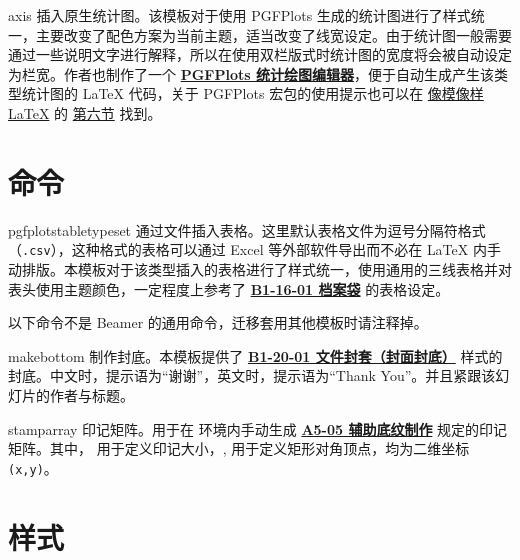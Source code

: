\documentclass[a4paper,12pt]{article}
\begin{document}
\begin{CJK}{UTF8}{song}
\begin{docEnvironment*}[doclang/environment content=code]{axis}{}
    插入原生统计图。该模板对于使用 \textsf{PGFPlots} 生成的统计图进行了样式统一，主要改变了配色方案为当前主题，适当改变了线宽设定。由于统计图一般需要通过一些说明文字进行解释，所以在使用双栏版式时统计图的宽度将会被自动设定为栏宽。作者也制作了一个 \href{https://logcreative.github.io/PGFPlotsEdt/}{\textbf{PGFPlots 统计绘图编辑器}}，便于自动生成产生该类型统计图的 \LaTeX{} 代码，关于 \textsf{PGFPlots} 宏包的使用提示也可以在 \href{https://logcreative.github.io/LaTeXSparkle/}{像模像样\LaTeX} 的 \href{https://logcreative.github.io/LaTeXSparkle/src/art/chapter06.html}{第六节} 找到。
\end{docEnvironment*}

\section{命令}

\begin{docCommand*}[]{pgfplotstabletypeset}{}
    通过文件插入表格。这里默认表格文件为逗号分隔符格式（\verb".csv"），这种格式的表格可以通过 Excel 等外部软件导出而不必在 \LaTeX{} 内手动排版。本模板对于该类型插入的表格进行了样式统一，使用通用的三线表格并对表头使用主题颜色，一定程度上参考了 \href{https://vi.sjtu.edu.cn/index.php/articles/app/7}{\textbf{B1-16-01 档案袋}} 的表格设定。
\end{docCommand*}

以下命令不是 \textsf{Beamer} 的通用命令，迁移套用其他模板时请注释掉。

\begin{docCommand*}[]{makebottom}{}
    制作封底。本模板提供了 \href{https://vi.sjtu.edu.cn/index.php/articles/app/7}{\textbf{B1-20-01 文件封套（封面封底）}} 样式的封底。中文时，提示语为“谢谢”，英文时，提示语为``Thank You''。并且紧跟该幻灯片的作者与标题。
\end{docCommand*}

\begin{docCommand*}[]{stamparray}{}
    印记矩阵。用于在  环境内手动生成 \href{http://vi.sjtu.edu.cn/index.php/articles/base/5}{\textbf{A5-05 辅助底纹制作}} 规定的印记矩阵。其中， 用于定义印记大小，, 用于定义矩形对角顶点，均为二维坐标 \verb"(x,y)"。 
\end{docCommand*}

\newpage
\section{样式}


\end{CJK}
\end{document}
